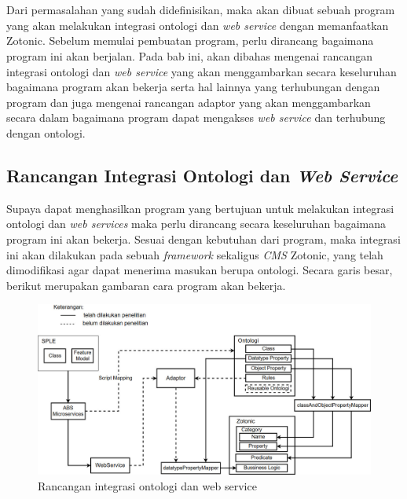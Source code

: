 \chapter{\babTiga}

Dari permasalahan yang sudah didefinisikan, maka akan dibuat sebuah program yang akan melakukan integrasi ontologi dan \textit{web service} dengan memanfaatkan Zotonic. Sebelum memulai pembuatan program, perlu dirancang bagaimana program ini akan berjalan. Pada bab ini, akan dibahas mengenai rancangan integrasi ontologi dan \textit{web service} yang akan menggambarkan secara keseluruhan bagaimana program akan bekerja serta hal lainnya yang terhubungan dengan program dan juga mengenai rancangan adaptor yang akan menggambarkan secara dalam bagaimana program dapat mengakses \textit{web service} dan terhubung dengan ontologi.
\section{Rancangan Integrasi Ontologi dan \textit{Web Service}}

Supaya dapat menghasilkan program yang bertujuan untuk melakukan integrasi ontologi dan \textit{web services} maka perlu dirancang secara keseluruhan bagaimana program ini akan bekerja. Sesuai dengan kebutuhan dari program, maka integrasi ini akan dilakukan pada sebuah \textit{framework} sekaligus \textit{CMS} Zotonic, yang telah dimodifikasi agar dapat menerima masukan berupa ontologi. Secara garis besar, berikut merupakan gambaran cara program akan bekerja.

\begin{figure}
	\centering
	\includegraphics[width=1\textwidth]
		{pics/skripsiRoadmapNew.jpg}
	\caption{Rancangan integrasi ontologi dan web service}
	\label{fig:skripsiroadmap}
\end{figure}
\vspace{-0.3cm}

